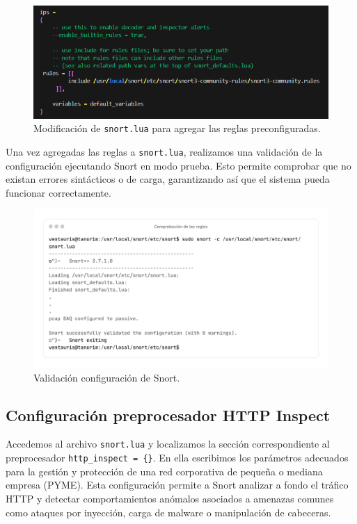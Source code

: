 \documentclass[11pt,a4paper,twoside]{report}
\begin{document}
\begin{figure}[H]
	\centering
	\includegraphics[scale=0.8]{instalacion_reglas_snort/2.png}
	\caption{Modificación de \texttt{snort.lua} para agregar las reglas preconfiguradas.}
\end{figure}

Una vez agregadas las reglas a \texttt{snort.lua}, realizamos una validación de la configuración ejecutando Snort en modo prueba. Esto permite comprobar que no existan errores sintácticos o de carga, garantizando así que el sistema pueda funcionar correctamente.

\begin{figure}[H]
	\centering
	\includegraphics[scale=0.12]{instalacion_reglas_snort/3-3.png}
	\caption{Validación configuración de Snort.}
\end{figure}

\newpage

\subsection{Configuración preprocesador HTTP Inspect}

Accedemos al archivo \texttt{snort.lua} y localizamos la sección correspondiente al preprocesador \texttt{http\_inspect = \{\}}. En ella escribimos los parámetros adecuados para la gestión y protección de una red corporativa de pequeña o mediana empresa (PYME). Esta configuración permite a Snort analizar a fondo el tráfico HTTP y detectar comportamientos anómalos asociados a amenazas comunes como ataques por inyección, carga de malware o manipulación de cabeceras.
\end{document}
